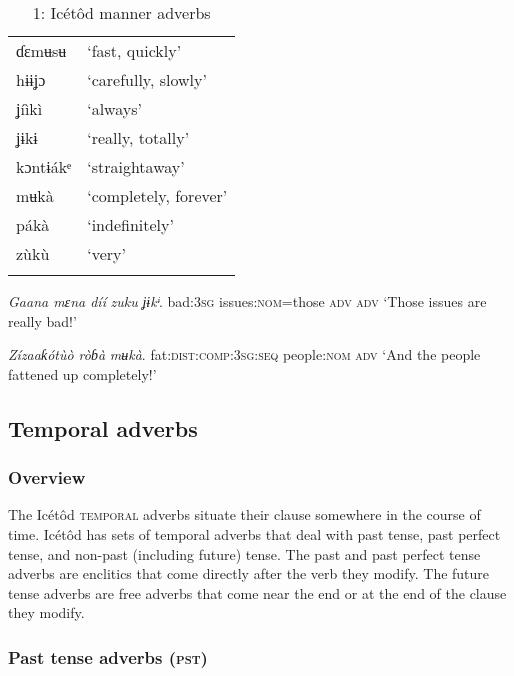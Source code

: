 \begin{table}
\caption{1: Icétôd manner adverbs}
\label{tab:9}


\begin{tabularx}{\textwidth}{XX}
\lsptoprule

ɗɛmʉsʉ & ‘fast, quickly’\\
hɨɨʝɔ & ‘carefully, slowly’\\
ʝíìkì & ‘always’\\
ʝɨkɨ & ‘really, totally’\\
kɔntɨákᵉ & ‘straightaway’\\
mʉkà & ‘completely, forever’\\
pákà & ‘indefinitely’\\
zùkù & ‘very’\\
\lspbottomrule
\end{tabularx}
\end{table}



\textit{Gaana   mɛna díí}     \textit{zuku}\textit{}   \textit{ʝɨkᶤ}.
bad:\textsc{3sg}   issues:\textsc{nom}=those   \textsc{adv   adv}
‘Those issues are really bad!’




\textit{Zízaaƙótùò       ròɓà}     \textit{mʉkà}.
fat:\textsc{dist:comp:3sg:seq}   people:\textsc{nom}   \textsc{adv}
‘And the people fattened up completely!’






\subsection{Temporal adverbs}
\subsubsection{Overview}

The Icétôd \textsc{temporal} adverbs situate their clause somewhere in the course of time. Icétôd has sets of temporal adverbs that deal with past tense, past perfect tense, and non-past (including future) tense. The past and past perfect tense adverbs are enclitics that come directly after the verb they modify. The future tense adverbs are free adverbs that come near the end or at the end of the clause they modify. 


\subsubsection{Past tense adverbs (\textsc{pst})}

